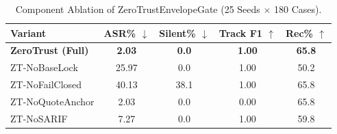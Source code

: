 \begin{table}[t]
\centering
\caption{Component Ablation of ZeroTrustEnvelopeGate (25 Seeds $\times$ 180 Cases).}
\label{tab:hpg_ablation}
\begin{tabular}{lcccc}
\toprule
\textbf{Variant} & \textbf{ASR\%} $\downarrow$ & \textbf{Silent\%} $\downarrow$ & \textbf{Track F1} $\uparrow$ & \textbf{Rec\%} $\uparrow$ \\
\midrule
\textbf{ZeroTrust (Full)} & \textbf{2.03} & \textbf{0.0} & \textbf{1.00} & \textbf{65.8} \\
ZT-NoBaseLock & 25.97 & 0.0 & 1.00 & 50.2 \\
ZT-NoFailClosed & 40.13 & 38.1 & 1.00 & 65.8 \\
ZT-NoQuoteAnchor & 2.03 & 0.0 & 0.00 & 65.8 \\
ZT-NoSARIF & 7.27 & 0.0 & 1.00 & 59.8 \\
\bottomrule
\end{tabular}
\end{table}
